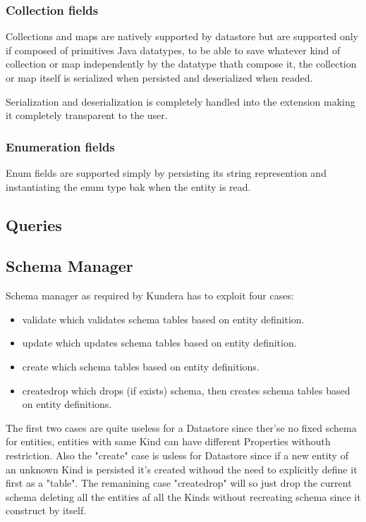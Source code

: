 \subsubsection{Collection fields}
Collections and maps are natively supported by datastore but are supported only if composed of primitives Java datatypes, to be able to save whatever kind of collection or map independently by the datatype thath compose it, the collection or map itself is serialized when persisted and deserialized when readed.

Serialization and deserialization is completely handled into the extension making it completely transparent to the user.

\subsubsection{Enumeration fields}
Enum fields are supported simply by persisting its string represention and instantiating the enum type bak when the entity is read.

\subsection{Queries}

\subsection{Schema Manager}
Schema manager as required by Kundera has to exploit four cases:
\begin{itemize}
\item validate which validates schema tables based on entity definition.
\item update which updates schema tables based on entity definition.
\item create which schema tables based on entity definitions.
\item create\textunderscore drop which drops (if exists) schema, then creates schema tables based on entity definitions.
\end{itemize}
The first two cases are quite useless for a Datastore since ther'se no fixed schema for entities, entities with same Kind can have different Properties withouth restriction.
Also the "create" case is usless for Datastore since if a new entity of an unknown Kind is persisted it's created withoud the need to explicitly define it first as a "table".
The remanining case "create\textunderscore drop" will so just drop the current schema deleting all the entities af all the Kinds without recreating schema since it construct by itself.

